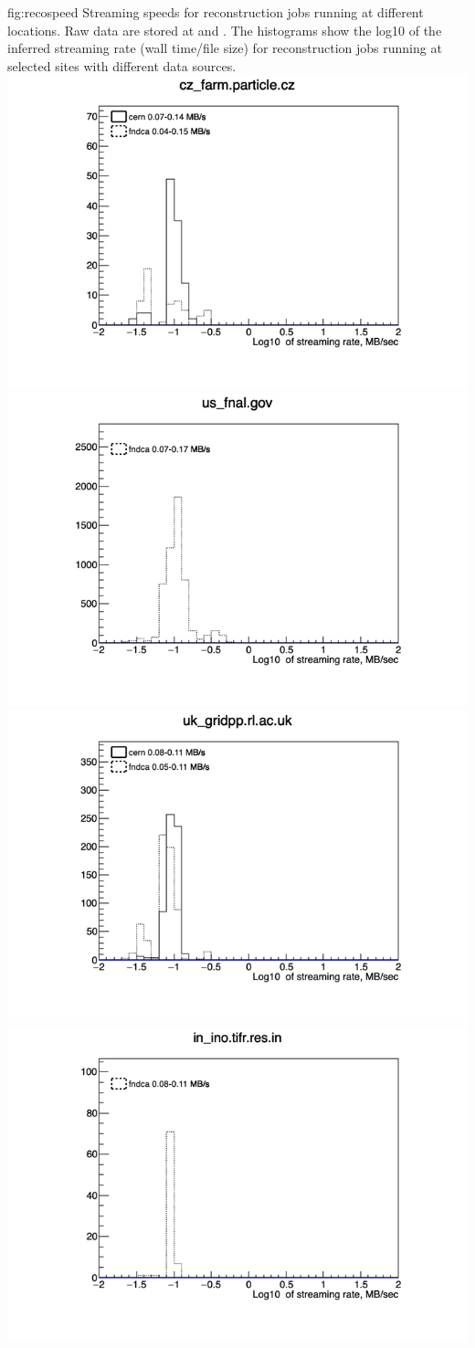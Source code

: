 \documentclass[../main-v1.tex]{subfiles}
\begin{document}
\begin{dunefigure}
{fig:recospeed} 
{Streaming speeds for reconstruction jobs running at different locations. Raw data are stored at  and .  The histograms show the log10 of the inferred streaming rate (wall time/file size) for reconstruction jobs running at selected sites with different data sources.}
\includegraphics[width=0.45 \textwidth]{graphics/Workflow/dune_slow_2021_01_01_2021_04_30_0_cz_farm.particle.cz.png}
\includegraphics[width=0.45 \textwidth]{graphics/Workflow/dune_slow_2021_01_01_2021_04_30_0_us_fnal.gov.png}
\includegraphics[width=0.45 \textwidth]{graphics/Workflow/dune_slow_2021_01_01_2021_04_30_0_uk_gridpp.rl.ac.uk.png}
\includegraphics[width=0.45 \textwidth]{graphics/Workflow/dune_slow_2021_01_01_2021_04_30_0_in_ino.tifr.res.in.png}
\end{dunefigure}
\end{document}
